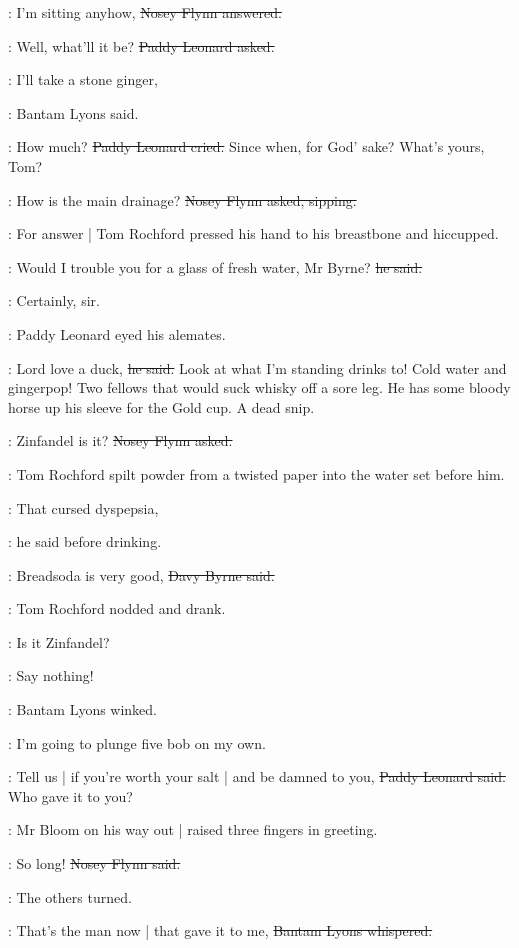 \nosey:
I'm sitting anyhow,
\sout{Nosey Flynn answered.}

\leonard:
Well, what'll it be?
\sout{Paddy Leonard asked.}

\bantam:
I'll take a stone ginger,

:
Bantam Lyons said.

\leonard:
How much?
\sout{Paddy Leonard cried.}
Since when, for God' sake?
What's yours, Tom?

\nosey:
How is the main drainage?
\sout{Nosey Flynn asked, sipping.}

:
For answer |
Tom Rochford pressed his hand to his breastbone and hiccupped.

\rochford:
Would I trouble you for a glass of fresh water, Mr Byrne?
\sout{he said.}

\davybyrne:
Certainly, sir.

:
Paddy Leonard eyed his alemates.

\leonard:
Lord love a duck,
\sout{he said.}
Look at what I'm standing drinks to!
Cold water and gingerpop!
Two fellows that would suck whisky off a sore leg.
He has some bloody horse up his sleeve for the Gold cup.
A dead snip.

\nosey:
Zinfandel is it?
\sout{Nosey Flynn asked.}

:
Tom Rochford spilt powder from a twisted paper
into the water set before him.

\rochford:
That cursed dyspepsia,

:
he said before drinking.

\davybyrne:
Breadsoda is very good,
\sout{Davy Byrne said.}

:
Tom Rochford nodded and drank.

\nosey:
Is it Zinfandel?

\bantam:
Say nothing!

:
Bantam Lyons winked.

\bantam:
I'm going to plunge five bob on my own.

\leonard:
Tell us |
if you're worth your salt |
and be damned to you,
\sout{Paddy Leonard said.}
Who gave it to you?

:
Mr Bloom on his way out |
raised three fingers in greeting.

\nosey:
So long!
\sout{Nosey Flynn said.}

:
The others turned.

\bantam:
That's the man now |
that gave it to me,
\sout{Bantam Lyons whispered.}

